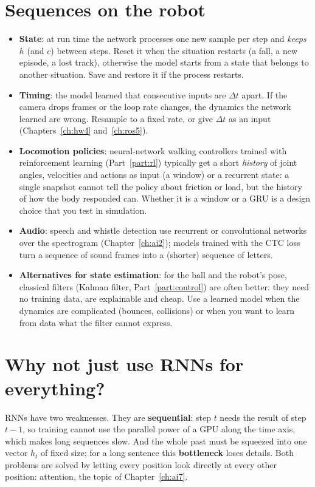 \section*{Sequences on the robot}
\begin{itemize}[nosep]
\item \textbf{State}: at run time the network processes one new sample per step and \emph{keeps} $h$ (and $c$) between steps. Reset it when the situation restarts (a fall, a new episode, a lost track), otherwise the model starts from a state that belongs to another situation. Save and restore it if the process restarts.
\item \textbf{Timing}: the model learned that consecutive inputs are $\Delta t$ apart. If the camera drops frames or the loop rate changes, the dynamics the network learned are wrong. Resample to a fixed rate, or give $\Delta t$ as an input (Chapters~\ref{ch:hw4} and~\ref{ch:ros5}).
\item \textbf{Locomotion policies}: neural-network walking controllers trained with reinforcement learning (Part~\ref{part:rl}) typically get a short \emph{history} of joint angles, velocities and actions as input (a window) or a recurrent state: a single snapshot cannot tell the policy about friction or load, but the history of how the body responded can. Whether it is a window or a GRU is a design choice that you test in simulation.
\item \textbf{Audio}: speech and whistle detection use recurrent or convolutional networks over the spectrogram (Chapter~\ref{ch:ai2}); models trained with the CTC loss turn a sequence of sound frames into a (shorter) sequence of letters.
\item \textbf{Alternatives for state estimation}: for the ball and the robot's pose, classical filters (Kalman filter, Part~\ref{part:control}) are often better: they need no training data, are explainable and cheap. Use a learned model when the dynamics are complicated (bounces, collisions) or when you want to learn from data what the filter cannot express.
\end{itemize}

\section*{Why not just use RNNs for everything?}
RNNs have two weaknesses. They are \textbf{sequential}: step $t$ needs the result of step $t-1$, so training cannot use the parallel power of a GPU along the time axis, which makes long sequences slow. And the whole past must be squeezed into one vector $h_t$ of fixed size; for a long sentence this \textbf{bottleneck} loses details. Both problems are solved by letting every position look directly at every other position: attention, the topic of Chapter~\ref{ch:ai7}.


